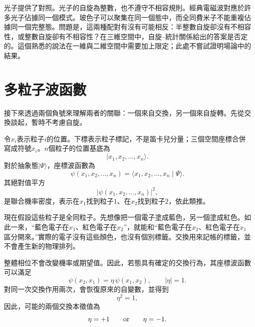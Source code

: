 光子提供了對照。光子的自旋為整數，也不遵守不相容規則。經典電磁波對應於許多光子佔據同一個模式。玻色子可以聚集在同一個態中，而全同費米子不能重複佔據同一個完整態。問題是，這兩種配對有沒有可能相反：半整數自旋卻沒有不相容性，或整數自旋卻有不相容性？在三維空間中，自旋--統計關係給出的答案是否定的。這個熟悉的說法在一維與二維空間中需要加上限定；此處不嘗試證明場論中的結果。

\begin{classroomqa}
\end{classroomqa}

\section{多粒子波函數}

接下來透過兩個負號來理解兩者的關聯：一個來自交換，另一個來自旋轉。先從交換談起，暫時不考慮自旋。

令\(x_i\)表示粒子\(i\)的位置。下標表示粒子標記，不是笛卡兒分量；三個空間座標合併寫成符號\(x_i\)。\(n\)個粒子的位置基底為
\begin{equation}
\lvert x_1,x_2,\ldots,x_n\rangle.
\end{equation}
對於抽象態\(\lvert\Psi\rangle\)，座標波函數為
\begin{equation}
\psi(x_1,x_2,\ldots,x_n)
=
\langle x_1,x_2,\ldots,x_n\mid\Psi\rangle.
\end{equation}
其絕對值平方
\begin{equation}
\bigl\lvert\psi(x_1,x_2,\ldots,x_n)\bigr\rvert^2,
\end{equation}
是聯合機率密度，表示在\(x_1\)找到粒子\(1\)、在\(x_2\)找到粒子\(2\)，依此類推。

現在假設這些粒子是全同粒子。先想像把一個電子塗成藍色，另一個塗成紅色。如此一來，``藍色電子在\(x_1\)、紅色電子在\(x_2\)''，就能和``藍色電子在\(x_2\)、紅色電子在\(x_1\)區分開來。''實際的電子沒有這些顏色，也沒有個別標籤。交換用來記帳的標籤，並不會產生新的物理排列。

整體相位不會改變機率或期望值。因此，若態具有確定的交換行為，其座標波函數可以滿足
\begin{equation}
\psi(x_2,x_1)=\eta\,\psi(x_1,x_2),
\qquad
\lvert\eta\rvert=1.
\end{equation}
對同一次交換作用兩次，會恢復原來的自變數，並得到
\begin{equation}
\eta^2=1,
\end{equation}
因此，可能的兩個交換本徵值為
\begin{equation}
\eta=+1
\qquad\hbox{or}\qquad
\eta=-1.
\end{equation}


